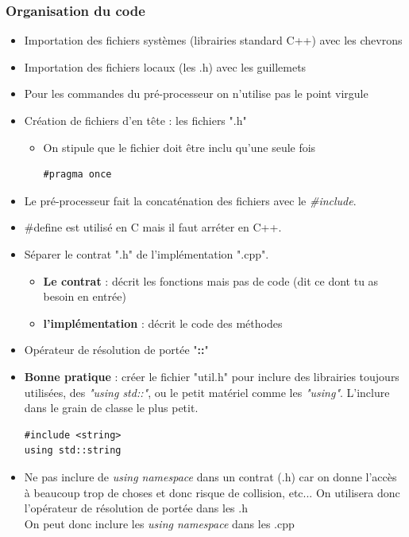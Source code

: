 \documentclass[12pt,a4paper]{article}
\begin{document}
\subsubsection{Organisation du code}
\begin{itemize}
\item Importation des fichiers systèmes (librairies standard C++) avec les chevrons
\item Importation des fichiers locaux (les .h) avec les guillemets
\item Pour les commandes du pré-processeur on n'utilise pas le point virgule
\item Création de fichiers d'en tête : les fichiers ".h"
\begin{itemize}
\item On stipule que le fichier doit être inclu qu'une seule fois
\begin{lstlisting}
#pragma once
\end{lstlisting}
\end{itemize}
\item Le pré-processeur fait la concaténation des fichiers avec le \textit{\#include}.
\item \#define est utilisé en C mais il faut arréter en C++.
\item Séparer le contrat ".h" de l'implémentation ".cpp".
\begin{itemize}
\item \textbf{Le contrat} : décrit les fonctions mais pas de code (dit ce dont tu as besoin en entrée)
\item \textbf{l'implémentation} : décrit le code des méthodes
\end{itemize}
\item Opérateur de résolution de portée "\textbf{::}"
\item \textbf{Bonne pratique} : créer le fichier "util.h" pour inclure des librairies toujours utilisées, des \textit{"using std::"}, ou le petit matériel comme les \textit{"using"}. L'inclure dans le grain de classe le plus petit.
\begin{lstlisting}
#include <string>
using std::string
\end{lstlisting}
\item Ne pas inclure de \textit{using namespace} dans un contrat (.h) car on donne l'accès à beaucoup trop de choses et donc risque de collision, etc... On utilisera donc l'opérateur de résolution de portée dans les .h\\
On peut donc inclure les \textit{using namespace} dans les .cpp

\end{itemize}
\end{document}
